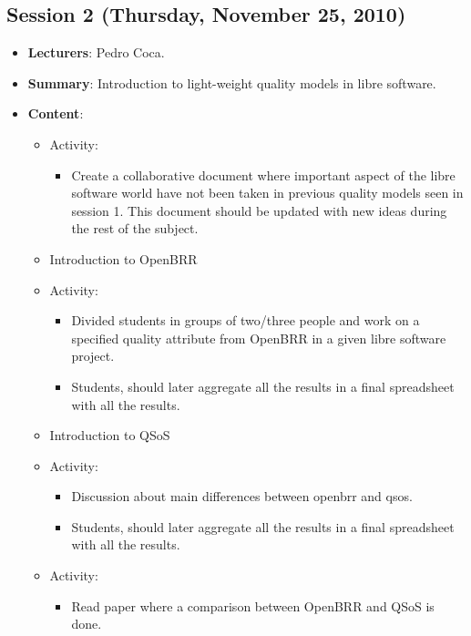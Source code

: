 \documentclass[a4paper]{article}
\begin{document}
\subsection{Session 2 (Thursday, November 25, 2010)}

\begin{itemize}
 \item \textbf{Lecturers}: Pedro Coca.
 \item \textbf{Summary}: Introduction to light-weight quality models in libre software.
 \item \textbf{Content}:

 \begin{itemize}
      \item Activity:
        \begin{itemize}
          \item Create a collaborative document where important aspect of the libre software world
          have not been taken in previous quality models seen in session 1. This document should 
          be updated with new ideas during the rest of the subject.
        \end{itemize}
      \item Introduction to OpenBRR
      \item Activity: 
        \begin{itemize}
          \item Divided students in groups of two/three people and work on a specified quality attribute from OpenBRR
          in a given libre software project.
          \item Students, should later aggregate all the results in a final spreadsheet with all the results.
        \end{itemize}
       \item Introduction to QSoS
       \item Activity:
         \begin{itemize}
           \item Discussion about main differences between openbrr and qsos.
           \item Students, should later aggregate all the results in a final spreadsheet with all the results.
         \end{itemize}
       \item Activity:
         \begin{itemize}
          \item Read paper where a comparison between OpenBRR and QSoS is done.
        \end{itemize}

 \end{itemize}    

\end{itemize}
\end{document}
